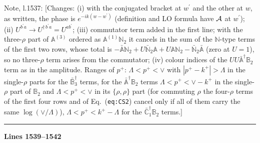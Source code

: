 \documentclass[10pt]{article}
\newenvironment{notebox}{\def\FrameCommand{{\color{notebar}\vrule width 1.5pt}\hspace{6pt}}\MakeFramed{\advance\hsize-\width\FrameRestore}\small}{\endMakeFramed}
\def\mf#1{\mathbb{#1}}
\begin{document}
\begin{notebox}\textsf{\small Note, l.1537:} [Changes: (i) with the conjugated bracket at $w^\prime$ and the other at $w$, as written, the phase is $e^{-ik(w-w^\prime)}$ (definition and LO formula have ${\cal A}$ at $w^\prime$); (ii) $U^{b^\prime a}\to U^{\dagger\, b^\prime a}=U^{ab^\prime}$; (iii) commutator term added in the first line; with the three-$\rho$ part of $\mf{A}^{(3)}$ ordered as $\mf{A}^{(1)}\mf{N}_2$ it cancels in the sum of the $\mf{N}$-type terms of the first two rows, whose total is $-\bar{\mf{A}}\mf{N}_2+U\bar{\mf{N}}_2\mf{A}+U\mf{A}\mf{N}_2-\bar{\mf{N}}_2\bar{\mf{A}}$ (zero at $U=1$), so no three-$\rho$ term arises from the commutator; (iv) colour indices of the $UU\bar{\mf{A}}^\dagger\mf{B}_2$ term as in the amplitude. Ranges of $p^+$: $\Lambda<p^+<\vee$ with $|p^+-k^+|>\Lambda$ in the single-$\rho$ parts for the $\bar{\mf{B}}_3^\dagger$ terms, for the $\bar{\mf{A}}^\dagger\mf{B}_2$ terms $\Lambda<p^+<\vee-k^+$ in the single-$\rho$ part of $\mf{B}_2$ and $\Lambda<p^+<\vee$ in its $\{\rho,\rho\}$ part (for commuting $\rho$ the four-$\rho$ terms of the first four rows and of Eq.~(\texttt{eq:CS2}) cancel only if all of them carry the same $\log(\vee/\Lambda)$), $\Lambda<p^+<k^+-\Lambda$ for the $\bar{\mf{C}}_1^\dagger\mf{B}_2$ terms.]\end{notebox}
\noindent\rule{\linewidth}{0.3pt}\par\noindent\textbf{Lines 1539--1542} \par
\end{document}
